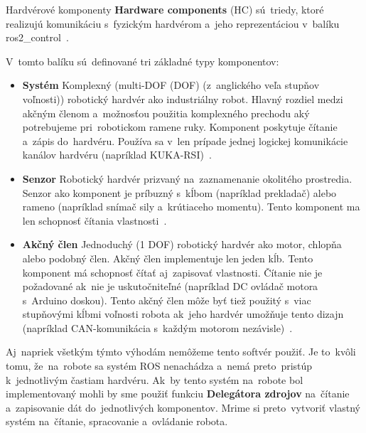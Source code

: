 Hardvérové komponenty \textbf{Hardware components} (HC) sú~triedy, ktoré realizujú komunikáciu s~fyzickým hardvérom
a~jeho reprezentáciou v~balíku ros2\_control~\cite{roscontrol}.

\clearpage

V~tomto balíku sú~definované tri základné typy komponentov:

\begin{itemize}
	\item \textbf{Systém} Komplexný (multi-DOF (\acrlong{DOF}) (z~anglického veľa stupňov voľnosti)) robotický hardvér ako industriálny
		robot. Hlavný rozdiel medzi akčným členom a~možnosťou použitia komplexného prechodu aký potrebujeme
		pri~robotickom ramene ruky. Komponent poskytuje čítanie a~zápis do~hardvéru. Používa sa v~len prípade jednej
		logickej komunikácie kanálov hardvéru (napríklad KUKA-RSI)~\cite{roscontrol}.
	\item \textbf{Senzor} Robotický hardvér prizvaný na~zaznamenanie okolitého prostredia. Senzor ako komponent je
		príbuzný s~kĺbom (napríklad prekladač) alebo rameno (napríklad snímač sily a~krútiaceho momentu). Tento
		komponent ma len schopnosť čítania vlastnosti~\cite{roscontrol}.
	\item \textbf{Akčný člen} Jednoduchý (1 DOF) robotický hardvér ako motor, chlopňa alebo podobný člen.
		Akčný člen implementuje len jeden kĺb. Tento komponent má schopnosť čítať aj~zapisovať vlastnosti. Čítanie nie
		je požadované ak~nie je uskutočniteľné (napríklad DC ovládač motora s~Arduino doskou). Tento akčný člen môže byť
		tiež použitý s~viac stupňovými kĺbmi voľnosti robota ak~jeho hardvér umožňuje tento dizajn (napríklad
		CAN-komunikácia s~každým motorom nezávisle)~\cite{roscontrol}.
\end{itemize}

Aj~napriek všetkým týmto výhodám nemôžeme tento softvér použiť. Je to~kvôli tomu, že~na~robote sa systém ROS nenachádza
a~nemá preto~pristúp k~jednotlivým častiam hardvéru. Ak~by tento systém na~robote bol implementovaný mohli by sme použiť
funkciu \textbf{Delegátora zdrojov} na~čítanie a~zapisovanie dát do~jednotlivých komponentov. Mrime si preto~vytvoriť
vlastný systém na~čítanie, spracovanie a~ovládanie robota.

